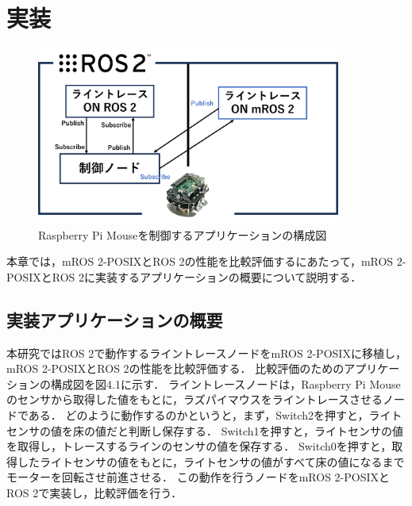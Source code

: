 \chapter{実装}
\begin{figure}[ht]
    \centering
    \includegraphics[width=10cm]{images/fig4_mros2_ros2_raspimouse_configuration.png}
    \caption{Raspberry Pi Mouseを制御するアプリケーションの構成図}
    \label{fig:raspimouse_configuration}
\end{figure}
\label{chap:implementation}
本章では，mROS 2-POSIXとROS 2の性能を比較評価するにあたって，mROS 2-POSIXとROS 2に実装するアプリケーションの概要について説明する．
\section{実装アプリケーションの概要}
本研究ではROS 2で動作するライントレースノードをmROS 2-POSIXに移植し，mROS 2-POSIXとROS 2の性能を比較評価する．
比較評価のためのアプリケーションの構成図を図4.1に示す．
ライントレースノードは，Raspberry Pi Mouseのセンサから取得した値をもとに，ラズパイマウスをライントレースさせるノードである．
どのように動作するのかというと，まず，Switch2を押すと，ライトセンサの値を床の値だと判断し保存する．
Switch1を押すと，ライトセンサの値を取得し，トレースするラインのセンサの値を保存する．
Switch0を押すと，取得したライトセンサの値をもとに，ライトセンサの値がすべて床の値になるまでモーターを回転させ前進させる．
この動作を行うノードをmROS 2-POSIXとROS 2で実装し，比較評価を行う．
